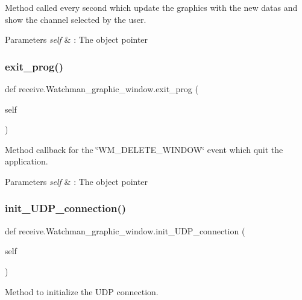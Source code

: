 Method called every second which update the graphics with the new datas and show the channel selected by the user. 


\begin{DoxyParams}{Parameters}
{\em self} & \+: The object pointer \\
\hline
\end{DoxyParams}
\mbox{\label{classreceive_1_1_watchman__graphic__window_a22cace25ba6be74a865cabbde2b0de65}} 
\subsubsection{exit\_prog()}
{\footnotesize\ttfamily def receive.\+Watchman\+\_\+graphic\+\_\+window.\+exit\+\_\+prog (\begin{DoxyParamCaption}\item[{}]{self }\end{DoxyParamCaption})}



Method callback for the \char`\"{}\+W\+M\+\_\+\+D\+E\+L\+E\+T\+E\+\_\+\+W\+I\+N\+D\+O\+W\char`\"{} event which quit the application. 


\begin{DoxyParams}{Parameters}
{\em self} & \+: The object pointer \\
\hline
\end{DoxyParams}
\mbox{\label{classreceive_1_1_watchman__graphic__window_acced41ba9696b91f924f1505a6d7b88f}} 
\subsubsection{init\_UDP\_connection()}
{\footnotesize\ttfamily def receive.\+Watchman\+\_\+graphic\+\_\+window.\+init\+\_\+\+U\+D\+P\+\_\+connection (\begin{DoxyParamCaption}\item[{}]{self }\end{DoxyParamCaption})}



Method to initialize the U\+DP connection. 


